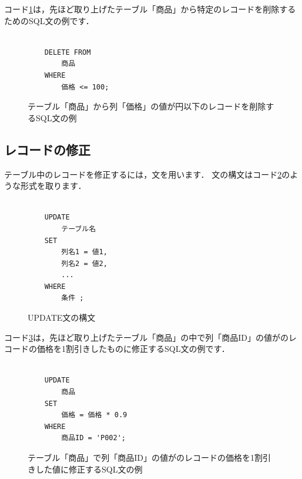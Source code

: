 コード\ref{code:delete-example}は，先ほど取り上げたテーブル「商品」から特定のレコードを削除するためのSQL文の例です．
\begin{figure}[!htbp]
    \begin{verbatim}

    DELETE FROM
        商品
    WHERE
        価格 <= 100;

    \end{verbatim}
    \captionsetup{name=コード}
    \caption{テーブル「商品」から列「価格」の値が円以下のレコードを削除するSQL文の例}
    \label{code:delete-example}
\end{figure}


\subsection{レコードの修正}
テーブル中のレコードを修正するには，文を用います．
文の構文はコード\ref{code:update-structure}のような形式を取ります．
\begin{figure}[!htbp]
    \begin{verbatim}

    UPDATE
        テーブル名
    SET
        列名1 = 値1,
        列名2 = 値2,
        ...
    WHERE
        条件 ;
    \end{verbatim}
    \captionsetup{name=コード}
    \caption{UPDATE文の構文}
    \label{code:update-structure}
\end{figure}

コード\ref{code:update-example}は，先ほど取り上げたテーブル「商品」の中で列「商品ID」の値がのレコードの価格を1割引きしたものに修正するSQL文の例です．
\begin{figure}[!htbp]
    \begin{verbatim}

    UPDATE
        商品
    SET
        価格 = 価格 * 0.9
    WHERE
        商品ID = 'P002';

    \end{verbatim}
    \captionsetup{name=コード}
    \caption{テーブル「商品」で列「商品ID」の値がのレコードの価格を1割引きした値に修正するSQL文の例}
    \label{code:update-example}
\end{figure}

